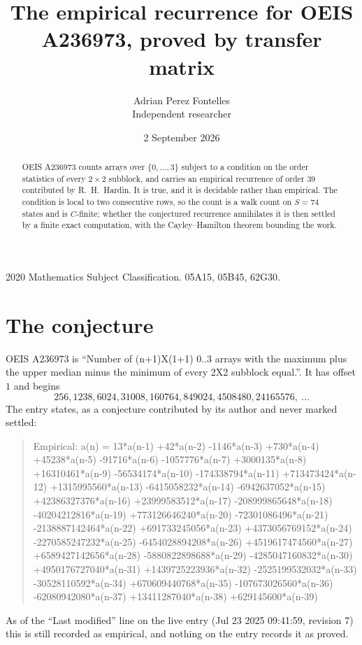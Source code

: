 \documentclass[11pt,a4paper]{article}
\title{The empirical recurrence for OEIS A236973, proved by transfer matrix}
\author{Adrian Perez Fontelles\\ \small Independent researcher}
\date{2 September 2026}
\theoremstyle{plain}
\theoremstyle{definition}
\begin{document}
\maketitle

\begin{abstract}
OEIS A236973 counts arrays over $\{0,\dots,3\}$ subject to a condition on the order
statistics of every $2\times2$ subblock, and carries an empirical recurrence of order
$39$ contributed by R.~H.~Hardin. It is true, and it is decidable rather than empirical.
The condition is local to two consecutive rows, so the count is a walk count on $S=74$
states and is $C$-finite; whether the conjectured recurrence annihilates it is then settled by
a finite exact computation, with the Cayley--Hamilton theorem bounding the work.
\end{abstract}

\noindent\small 2020 Mathematics Subject Classification. 05A15, 05B45, 62G30.\normalsize

\section{The conjecture}

OEIS A236973 is ``Number of (n+1)X(1+1) 0..3 arrays with the maximum plus the upper median minus the minimum of every 2X2 subblock equal.''. It has offset $1$ and begins
\[
256, 1238, 6024, 31008, 160764, 849024, 4508480, 24165576,\ \dots
\]
The entry states, as a conjecture contributed by its author and never marked settled:
\begin{quote}
Empirical: a(n) = 13*a(n-1) +42*a(n-2) -1146*a(n-3) +730*a(n-4) +45238*a(n-5) -91716*a(n-6) -1057776*a(n-7) +3000135*a(n-8) +16310461*a(n-9) -56534174*a(n-10) -174338794*a(n-11) +713473424*a(n-12) +1315995560*a(n-13) -6415058232*a(n-14) -6942637052*a(n-15) +42386327376*a(n-16) +23999583512*a(n-17) -208999865648*a(n-18) -40204212816*a(n-19) +773126646240*a(n-20) -72301086496*a(n-21) -2138887142464*a(n-22) +691733245056*a(n-23) +4373056769152*a(n-24) -2270585247232*a(n-25) -6454028894208*a(n-26) +4519617474560*a(n-27) +6589427142656*a(n-28) -5880822898688*a(n-29) -4285047160832*a(n-30) +4950176727040*a(n-31) +1439725223936*a(n-32) -2525199532032*a(n-33) -30528110592*a(n-34) +670609440768*a(n-35) -107673026560*a(n-36) -62080942080*a(n-37) +13411287040*a(n-38) +629145600*a(n-39)
\end{quote}
As of the ``Last modified'' line on the live entry (Jul 23 2025 09:41:59, revision 7) this is still
recorded as empirical, and nothing on the entry records it as proved.
\end{document}
